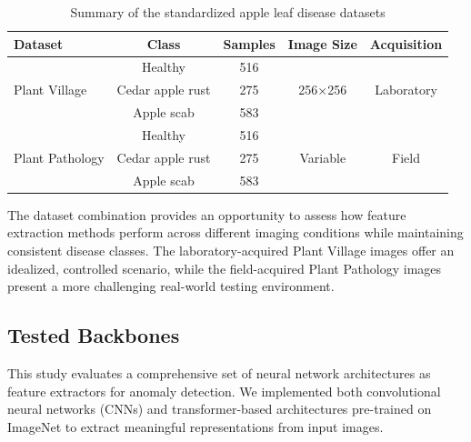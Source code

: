 \documentclass[12pt,a4paper,oneside]{report}
\begin{document}
\begin{table}[h]
\centering
\caption{Summary of the standardized apple leaf disease datasets}
\label{tab:datasets}
\begin{tabular}{lcccc}
\toprule
\textbf{Dataset} & \textbf{Class} & \textbf{Samples} & \textbf{Image Size} & \textbf{Acquisition} \\
\midrule
\multirow{3}{*}{Plant Village} & Healthy & 516 & \multirow{3}{*}{256×256} & \multirow{3}{*}{Laboratory} \\
 & Cedar apple rust & 275 & & \\
 & Apple scab & 583 & & \\
\midrule
\multirow{3}{*}{Plant Pathology} & Healthy & 516 & \multirow{3}{*}{Variable} & \multirow{3}{*}{Field} \\
 & Cedar apple rust & 275 & & \\
 & Apple scab & 583 & & \\
\bottomrule
\end{tabular}
\end{table}

The dataset combination provides an opportunity to assess how feature extraction methods perform across different imaging conditions while maintaining consistent disease classes. The laboratory-acquired Plant Village images offer an idealized, controlled scenario, while the field-acquired Plant Pathology images present a more challenging real-world testing environment.

\subsection{Tested Backbones}

This study evaluates a comprehensive set of neural network architectures as feature extractors for anomaly detection. We implemented both convolutional neural networks (CNNs) and transformer-based architectures pre-trained on ImageNet to extract meaningful representations from input images.
\end{document}
